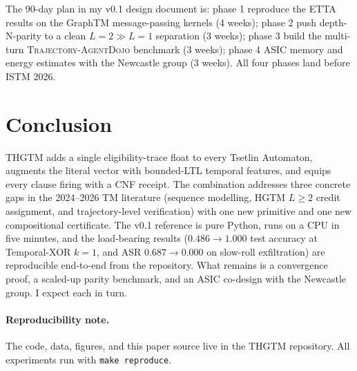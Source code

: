 \documentclass[11pt]{article}
\begin{document}
The 90-day plan in my v0.1 design document is: phase 1 reproduce the ETTA results on the GraphTM message-passing kernels (4 weeks); phase 2 push depth-N-parity to a clean $L\!=\!2 \!\gg\! L\!=\!1$ separation (3 weeks); phase 3 build the multi-turn \textsc{Trajectory-AgentDojo} benchmark (3 weeks); phase 4 ASIC memory and energy estimates with the Newcastle group (3 weeks).  All four phases land before ISTM 2026.

\section{Conclusion}

THGTM adds a single eligibility-trace float to every Tsetlin Automaton, augments the literal vector with bounded-LTL temporal features, and equips every clause firing with a CNF receipt.  The combination addresses three concrete gaps in the 2024--2026 TM literature (sequence modelling, HGTM $L\!\geq\!2$ credit assignment, and trajectory-level verification) with one new primitive and one new compositional certificate.  The v0.1 reference is pure Python, runs on a CPU in five minutes, and the load-bearing results ($0.486 \!\to\! 1.000$ test accuracy at Temporal-XOR $k\!=\!1$, and ASR $0.687 \!\to\! 0.000$ on slow-roll exfiltration) are reproducible end-to-end from the repository.  What remains is a convergence proof, a scaled-up parity benchmark, and an ASIC co-design with the Newcastle group.  I expect each in turn.

\paragraph{Reproducibility note.}  The code, data, figures, and this paper source live in the THGTM repository.  All experiments run with \texttt{make reproduce}.


\end{document}
